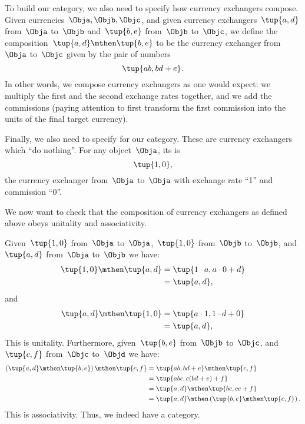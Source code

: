 To build our category, we also need to specify how currency exchangers compose.
Given currencies~$\Obja, \Objb, \Objc$, and given currency exchangers~$\tup{a,d}$ from~$\Obja$ to~$\Objb$ and~$\tup{b,e}$ from~$\Objb$ to~$\Objc$,
we define the composition~$\tup{a,d} \mthen \tup{b,e}$ to be the currency exchanger from~$\Obja$ to~$\Objc$ given by the pair of numbers
\begin{equation}
    \label{eq:comp-law-curr}
    \tup{ab, bd+e}.
\end{equation}
In other words, we compose currency exchangers as one would expect: we multiply the first and the second exchange rates together, and we add the commissions (paying attention to first transform the first commission into the units of the final target currency).

Finally, we also need to specify  for our category.
These are currency exchangers which ``do nothing''.
For any object~$\Obja$, its  is
\begin{equation}
    \tup{1,0},
\end{equation}
the currency exchanger from~$\Obja$ to~$\Obja$ with exchange rate ``1'' and commission ``0''.

We now want to check that the composition of currency exchangers as defined above obeys unitality and associativity.

Given~$\tup{1,0}$ from~$\Obja$ to~$\Obja$,~$\tup{1,0}$ from~$\Objb$ to~$\Objb$, and~$\tup{a,d}$ from~$\Obja$ to~$\Objb$ we have:
\begin{equation}
    \begin{aligned}
        \tup{1,0}\mthen\tup{a,d} & =\tup{1\cdot a, a\cdot 0+d} \\
                                 & =\tup{a,d},
    \end{aligned}
\end{equation}
and
\begin{equation}
    \begin{aligned}
        \tup{a,d}\mthen \tup{1,0} & =\tup{a\cdot 1, 1\cdot d+0} \\
                                  & =\tup{a,d},
    \end{aligned}
\end{equation}
This is unitality.
Furthermore, given~$\tup{b,e}$ from~$\Objb$ to~$\Objc$, and~$\tup{c,f}$ from~$\Objc$ to~$\Objd$ we have:
\begin{equation}
    \begin{aligned}
        \left( \tup{a,d}\mthen \tup{b,e}\right)\mthen \tup{c,f} & =\tup{ab,bd+e}\mthen \tup{c,f} \\
                                                                & =\tup{abc,c(bd+e)+f} \\
                                                                & =\tup{a,d}\mthen \tup{bc,ce+f} \\
                                                                & =\tup{a,d}\mthen \left( \tup{b,e}\mthen \tup{c,f}\right).
    \end{aligned}
\end{equation}
This is associativity.
Thus, we indeed have a category.


